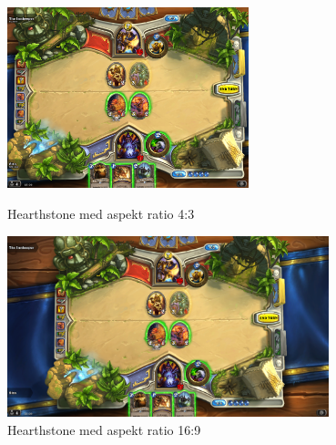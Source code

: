 \documentclass[Main.tex]{AspectRatio.tex}
\begin{document}
\begin{figure}[h]
\centering
\parbox{7cm}{
\includegraphics[width = 7cm]{billeder/Heathstone_4,3}
\caption{Hearthstone med aspekt ratio 4:3}
\label{Hearthstone_4,3}}
\qquad
\begin{minipage}{9.33cm}
\includegraphics[width = 9.33cm]{billeder/Heathstone_16,9}
\caption{Hearthstone med aspekt ratio 16:9}
\label{Hearthstone_16,9}
\end{minipage}
\end{figure}
\end{document}

